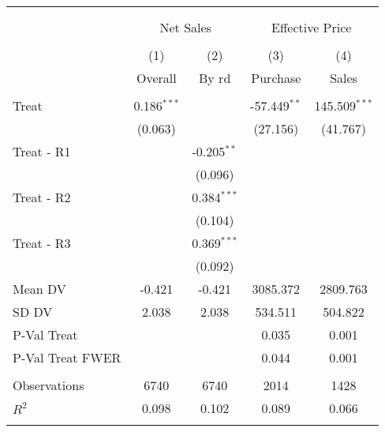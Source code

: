 \begin{tabular}{@{\extracolsep{5pt}}lcccc}
\\[-1.8ex]\hline
\hline \\[-1.8ex]
\\[-1.8ex] & \multicolumn{2}{c}{Net Sales} & \multicolumn{2}{c}{Effective Price}  \\
\\[-1.8ex] & (1) & (2) & (3) & (4) 
 \\ & Overall & By rd & Purchase & Sales \\
\hline \\[-1.8ex]
 Treat & 0.186$^{***}$ & & -57.449$^{**}$ & 145.509$^{***}$ \\
& (0.063) & & (27.156) & (41.767) \\
 Treat - R1 & & -0.205$^{**}$ & & \\
& & (0.096) & & \\
 Treat - R2 & & 0.384$^{***}$ & & \\
& & (0.104) & & \\
 Treat - R3 & & 0.369$^{***}$ & & \\
& & (0.092) & & \\
 Mean DV & -0.421 & -0.421 & 3085.372 & 2809.763 \\
 SD DV & 2.038 & 2.038 & 534.511 & 504.822 \\
 P-Val Treat &  &  & 0.035 & 0.001 \\
 P-Val Treat FWER &  &  & 0.044 & 0.001 \\
\hline \\[-1.8ex]
 Observations & 6740 & 6740 & 2014 & 1428 \\
 $R^2$ & 0.098 & 0.102 & 0.089 & 0.066 \\
\hline
\hline \\[-1.8ex]
\end{tabular}
